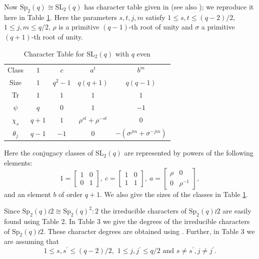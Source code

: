 \documentclass{amsart}
\begin{document}
Now $\mathrm{Sp}_{2}(q) \cong \mathrm{SL}_2(q)$ has  character table  given in \cite{Dor}  (see also  \cite {GH}); we reproduce it here in Table \ref{sleven}.
Here the parameters $s,t,j,m$ satisfy $1\leq s, t \leq (q-2)/2$, $1\leq j, m \leq q/2$,  $\rho$ is a primitive $(q-1)$-th root of unity and $\sigma$ a primitive $(q+1)$-th root of unity. 

\begin{table}[h!]
\centering
\caption{Character Table for $\mathrm{SL}_{2}(q)$ with $q$ even}
\label{sleven}
\vspace{5pt}
\begin{tabular}{c|cccc}
Class & $1$ & $c$ & $a^t$ & $b^m$\\
Size & $1$ & $q^2-1$ & $q(q+1)$ & $q(q-1)$\\
\hline
 Tr & $1$ & $1$ & $1$ & $1$\\
$\psi$ & $q$ & $0$ & $1$ & $-1$\\
$\chi_s$ & $q+1$ & $1$ & $\rho^{st}+\rho^{-st}$ & $0$\\
$\theta_j$ & $q-1$ & $-1$ & $0$ & $-(\sigma^{jm}+\sigma^{-jm})$\\
\end{tabular}
\end{table}

Here the conjugacy classes of SL$_2(q)$ are represented by powers of the following elements:
$$
1 = \begin{bmatrix}
1 & 0\\
0 & 1
\end{bmatrix},\ 
c=\begin{bmatrix}
1 & 0\\
1 & 1
\end{bmatrix},\ 
a=\begin{bmatrix}
\rho & 0\\
0 & \rho^{-1}
\end{bmatrix},
$$
and an element $b$ of order $q+1$. We also give the sizes of the classes in Table \ref{sleven}.

Since $\mathrm{Sp}_2(q)\wr 2 \cong \mathrm{Sp}_2(q)^2\colon 2$
  the irreducible characters of $\mathrm{Sp}_2(q)\wr 2$ are easily found using Table 2.
In Table 
   3 we give the degrees of the irreducible characters of $\mathrm{Sp}_2(q)\wr 2$.
These character degrees are obtained using \cite[Proposition $20.9$, Theorem $19.18$]{JaL}. Further, in Table 
 3 we are assuming that  
 $$1 \leq s, s^\prime \leq (q-2)/2, \,\,1 \leq j, j^\prime \leq q/2 \text { and } s\neq s^\prime,j\neq j^\prime.
 $$ 
\end{document}
